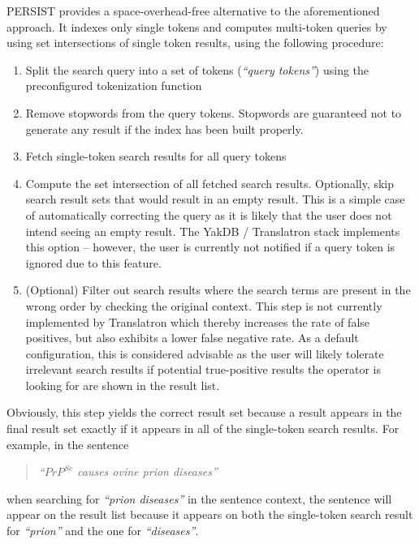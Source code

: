 \documentclass[a4paper, 12pt, twoside, reqn]{report}
\numberwithin{figure}{chapter}
\newtheorem[L]{boxedDefinition}{Definition}
\newtheorem[L]{boxedExample}{Example}
\newcommand{\itquote}[1]{\textit{{``}#1{''}}}
\begin{document}
PERSIST provides a space-overhead-free alternative to the aforementioned approach. It indexes only single tokens and computes multi-token queries by using set intersections of single token results, using the following procedure:
\begin{enumerate}[label={(\arabic*)}]
 \item Split the search query into a set of tokens (\itquote{query tokens}) using the preconfigured tokenization function
 
 \item Remove stopwords from the query tokens. Stopwords are guaranteed not to generate any result if the index has been built properly.
 
 \item Fetch single-token search results for all query tokens
 
 \item Compute the set intersection of all fetched search results. Optionally, skip search result sets that would result in an empty result. This is a simple case of automatically correcting the query as it is likely that the user does not intend seeing an empty result. The YakDB / Translatron stack implements this option -- however, the user is currently not notified if a query token is ignored due to this feature.
 
 \item (Optional) Filter out search results where the search terms are present in the wrong order by checking the original context. This step is not currently implemented by Translatron which thereby increases the rate of false positives, but also exhibits a lower false negative rate. As a default configuration, this is considered advisable as the user will likely tolerate irrelevant search results if potential true-positive results the operator is looking for are shown in the result list.

\end{enumerate}

Obviously, this step yields the correct result set because a result appears in the final result set exactly if it appears in all of the single-token search results. For example, in the sentence
\begin{quote}
 \itquote{$PrP^{Sc}$ causes ovine prion diseases}
\end{quote}
when searching for \itquote{prion diseases} in the sentence context, the sentence will appear on the result list because it appears on both the single-token search result for \itquote{prion} and the one for \itquote{diseases}.
\end{document}
